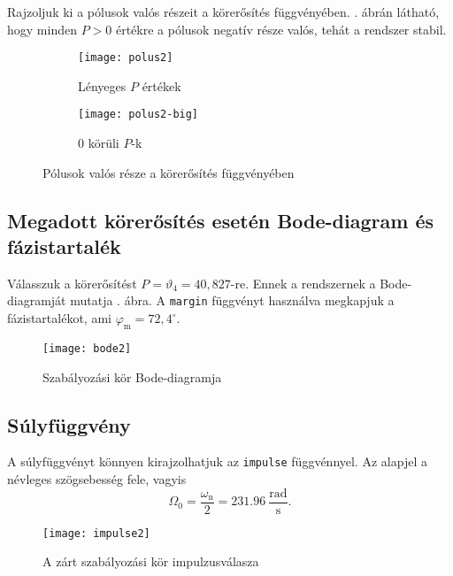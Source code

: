 Rajzoljuk ki a pólusok valós részeit a körerősítés függvényében.
. ábrán látható, hogy minden $P>0$ értékre a pólusok
negatív része valós, tehát a rendszer stabil.
\begin{figure}[H]
	\centering
	\begin{subfigure}{.49\textwidth}
		\texttt{[image: polus2]}
		\caption{Lényeges $P$ értékek}
	\end{subfigure}
	\begin{subfigure}{.49\textwidth}
		\texttt{[image: polus2-big]}
		\caption{0 körüli $P$-k}
	\end{subfigure}
	\caption{Pólusok valós része a körerősítés függvényében}
	\label{fig:poles2}
\end{figure}


\subsection{Megadott körerősítés esetén Bode-diagram és fázistartalék}

Válasszuk a körerősítést $P=\vartheta_4 = 40,827$-re.
Ennek a rendszernek a Bode-diagramját mutatja . ábra.
A \verb|margin| függvényt használva megkapjuk a fázistartalékot,
ami $\varphi_\text{m}=72,4^\circ$.

\begin{figure}[H]
	\centering
	\texttt{[image: bode2]}
	\caption{Szabályozási kör Bode-diagramja}
	\label{fig:bode2}
\end{figure}


\subsection{Súlyfüggvény}

A súlyfüggvényt könnyen kirajzolhatjuk az \verb|impulse| függvénnyel. Az alapjel
a névleges szögsebesség fele, vagyis
\begin{equation}
	\Omega_0 = \frac{\omega_\text{n}}{2} = 231.96~\frac{\text{rad}}{\text{s}}.
\end{equation}

\begin{figure}[H]
	\centering
	\texttt{[image: impulse2]}
	\caption{A zárt szabályozási kör impulzusválasza}
	\label{fig:impulse2}
\end{figure}

